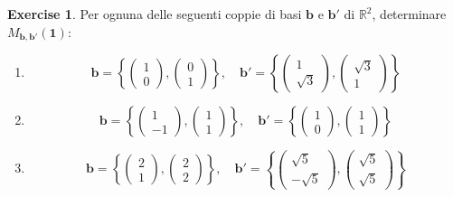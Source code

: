 \documentclass{article}
\theoremstyle{plain}
\theoremstyle{definition}
\newtheorem{xca}[exmp]{Exercise}
\theoremstyle{remark}
\begin{document}
\begin{bxthm}
\begin{xca}
Per ognuna delle seguenti coppie di basi \( \mathbf{b} \) e \( \mathbf{b}' \) di \( \mathbb{R}^2 \), determinare \( M_{\mathbf{b},\mathbf{b}'}(\mathbf{1}) \):
\begin{enumerate}
    \item \[ \mathbf{b} = \left\{\begin{pmatrix}1\\0\end{pmatrix}, \begin{pmatrix}0\\1\end{pmatrix} \right\}, \quad  \mathbf{b}' = \left\{\begin{pmatrix}1\\\sqrt{3}\end{pmatrix}, \begin{pmatrix}\sqrt{3}\\1\end{pmatrix}\right\} \]
    \item \[ \mathbf{b} = \left\{\begin{pmatrix}1\\-1\end{pmatrix}, \begin{pmatrix}1\\1\end{pmatrix}\right\}, \quad \mathbf{b}' =  \left\{\begin{pmatrix}1\\0\end{pmatrix}, \begin{pmatrix}1\\1\end{pmatrix}\right\} \]
    \item \[ \mathbf{b} = \left\{\begin{pmatrix}2\\1\end{pmatrix}, \begin{pmatrix}2\\2\end{pmatrix} \right\}, \quad  \mathbf{b}' = \left\{\begin{pmatrix}\sqrt{5}\\-\sqrt{5}\end{pmatrix}, \begin{pmatrix}\sqrt{5}\\\sqrt{5}\end{pmatrix}\right\} \]
\end{enumerate}
\end{xca}
\end{bxthm}
\end{document}
